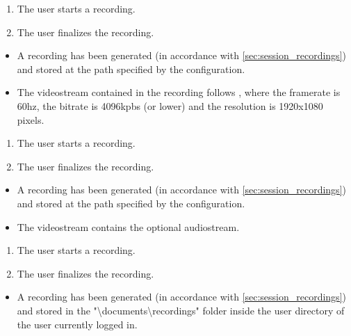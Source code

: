 \begin{tests}
    {\begin{enumerate}
        \item The \gls{user} starts a recording.
        \item The \gls{user} finalizes the recording.
    \end{enumerate}}
    {\begin{itemize}
        \item A recording has been generated (in accordance with \ref{sec:session_recordings}) and stored at the path specified by the configuration.
        \item The \gls{videostream} contained in the recording follows , where the framerate is 60hz, the bitrate is 4096kpbs (or lower) and the resolution is 1920x1080 pixels.
    \end{itemize}}

    {\begin{enumerate}
        \item The \gls{user} starts a recording.
        \item The \gls{user} finalizes the recording.
    \end{enumerate}}
    {\begin{itemize}
        \item A recording has been generated (in accordance with \ref{sec:session_recordings}) and stored at the path specified by the configuration.
        \item The \gls{videostream} contains the optional audiostream.
    \end{itemize}}

    {\begin{enumerate}
        \item The \gls{user} starts a recording.
        \item The \gls{user} finalizes the recording.
    \end{enumerate}}
    {\begin{itemize}
        \item A recording has been generated (in accordance with \ref{sec:session_recordings}) and stored in the "\textbackslash documents\textbackslash recordings" folder inside the \gls{user} directory of the \gls{user} currently logged in.
    \end{itemize}}


\end{tests}
